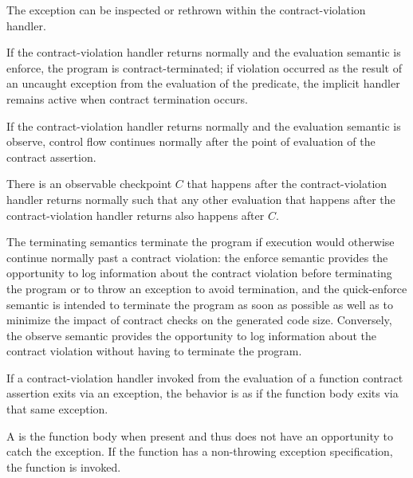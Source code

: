 \begin{note}
The exception can be inspected or rethrown within the contract-violation handler.
\end{note}

\pnum
{}%
If the contract-violation handler
returns normally
and the evaluation semantic is enforce,
the program is contract-terminated;
if violation occurred
as the result of an uncaught exception
from the evaluation of the predicate,
the implicit handler
remains active when contract termination occurs.

\pnum
{}%
\begin{note}
If the contract-violation handler
returns normally
and the evaluation semantic is observe,
control flow continues normally
after the point of evaluation of the contract assertion.
\end{note}

\pnum
There is an observable checkpoint $C$
that happens after the contract-violation handler returns normally
such that any other evaluation
that happens after the contract-violation handler returns
also happens after $C$.

\pnum
\begin{note}
The terminating semantics terminate the program
if execution would otherwise continue normally
past a contract violation:
the enforce semantic provides the opportunity to
log information about the contract violation
before terminating the program
or to throw an exception to avoid termination,
and the quick-enforce semantic is intended
to terminate the program as soon as possible
as well as
to minimize the impact of contract checks
on the generated code size.
Conversely,
the observe semantic
provides the opportunity to
log information about the contract violation
without having to terminate the program.
\end{note}

\pnum
If a contract-violation handler
invoked from the evaluation of a function contract assertion
exits via an exception,
the behavior is as if
the function body exits via that same exception.
\begin{note}
A 
is the function body when present
and thus does not
have an opportunity to catch the exception.
If the function
has a non-throwing exception specification,
the function  is invoked.
\end{note}

